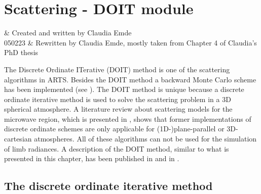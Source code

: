 \chapter{Scattering - DOIT module}
 \label{sec:scattering}

 & Created and written by Claudia Emde\\ 
 050223 & Rewritten by Claudia Emde, mostly taken from
 Chapter 4 of Claudia's PhD thesis 
\stophistory

The Discrete Ordinate ITerative (DOIT) method is one of the scattering
algorithms in ARTS. Besides the DOIT method a backward Monte Carlo
scheme has been implemented (see ). The DOIT
method is unique because a discrete ordinate iterative method is used to solve the
scattering problem in a 3D spherical atmosphere. A literature review
about scattering models for the microwave region, which is presented
in \citet{sreerekha04:_devel_rt_ghz_wp1}, shows that former implementations
of discrete ordinate schemes are only applicable for
(1D-)plane-parallel or 3D-cartesian atmospheres. All of these algorithms
can not be used for the simulation of limb radiances.
A description of the DOIT method, similar to what is presented in this
chapter, has been published in \citet{emde04:_doit_jgr} and in 
\citet{emde05:_phdthesis}. 


\section{The discrete ordinate iterative method}
\label{sec:scattering:doit}

